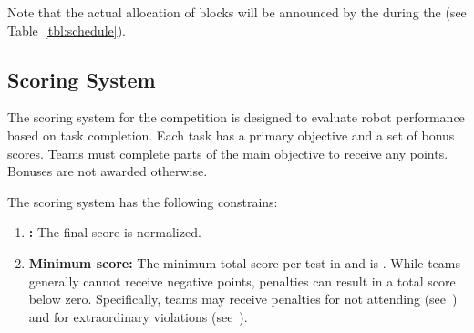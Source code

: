 \noindent Note that the actual allocation of blocks will be announced by the \OC{} during the \SetupDays{} (see Table~\ref{tbl:schedule}).

\subsection{Scoring System}\label{rule:score_system}

The scoring system for the competition is designed to evaluate robot performance based on task completion. Each task has a primary objective and a set of bonus scores. Teams must complete parts of the main objective to receive any points. Bonuses are not awarded otherwise.

The scoring system has the following constrains:
\begin{enumerate}
	\item \textbf{\FINAL:} The final score is normalized.
	\item \textbf{Minimum score:} The minimum total score per test in \SONE{} and \STWO{} is .
	While teams generally cannot receive negative points, penalties can result in a total score below zero. Specifically, teams may receive penalties for not attending (see~) and for extraordinary violations (see~).
\end{enumerate}

